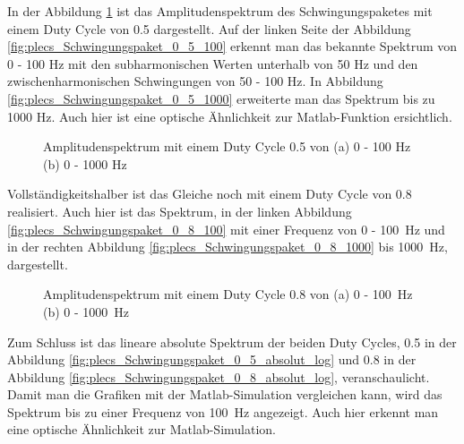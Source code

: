 \newpage
In der Abbildung \ref{fig:plecs_Schwingungspakete_Amplitudenspektrum_ 0_5_100_1000} ist das Amplitudenspektrum des Schwingungspaketes mit einem Duty Cycle von 0.5 dargestellt. Auf der linken Seite der Abbildung \ref{fig:plecs_Schwingungspaket_0_5_100} erkennt man das bekannte Spektrum von 0 - 100 Hz mit den subharmonischen Werten unterhalb von 50 Hz und den zwischenharmonischen Schwingungen von 50 - 100 Hz. In Abbildung  \ref{fig:plecs_Schwingungspaket_0_5_1000} erweiterte man das Spektrum bis zu 1000 Hz. Auch hier ist eine optische Ähnlichkeit zur  Matlab-Funktion ersichtlich.
  
\begin{figure}[ht!]
	\centering
	\qquad
	\caption{Amplitudenspektrum mit einem Duty Cycle 0.5 von (a) 0 - 100 Hz (b) 0 - 1000 Hz}
	\label{fig:plecs_Schwingungspakete_Amplitudenspektrum_ 0_5_100_1000}
\end{figure}

\newpage
Vollständigkeitshalber ist das Gleiche noch mit einem Duty Cycle von 0.8 realisiert. Auch hier ist das Spektrum, in der linken Abbildung \ref{fig:plecs_Schwingungspaket_0_8_100} mit einer Frequenz von 0 - \SI{100}{Hz} und in der rechten Abbildung \ref{fig:plecs_Schwingungspaket_0_8_1000} bis \SI{1000}{Hz}, dargestellt. 


\begin{figure}[ht!]
	\centering
	\qquad
	\caption{Amplitudenspektrum mit einem Duty Cycle 0.8 von (a) 0 - \SI{100}{Hz} (b) 0 - \SI{1000}{Hz}}
	\label{fig:plecs_Schwingungspakete_Amplitudenspektrum_ 0_8_100_1000}
\end{figure}

Zum Schluss ist das lineare absolute Spektrum der beiden Duty Cycles, 0.5 in der Abbildung \ref{fig:plecs_Schwingungspaket_0_5_absolut_log} und 0.8 in der Abbildung \ref{fig:plecs_Schwingungspaket_0_8_absolut_log}, veranschaulicht. Damit man die Grafiken mit der Matlab-Simulation vergleichen kann, wird das Spektrum bis zu einer Frequenz von \SI{100}{Hz} angezeigt. Auch hier erkennt man eine optische Ähnlichkeit zur Matlab-Simulation. 


